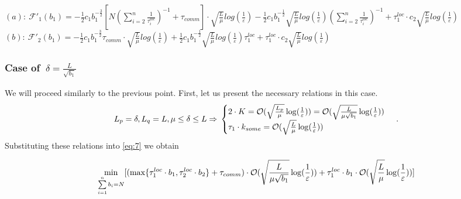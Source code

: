 \documentclass{article}
\begin{document}
$(a): ~\mathcal{F'}_1(b_1) = -\frac{1}{2}c_1 b_1^{-\frac{3}{2}}  [N (\sum\limits_{i = 2}^{n} \frac{1}{\tau_i^{loc}})^{-1} + \tau_{comm}]\cdot 
\sqrt{\frac{L}{\mu}}log (\frac{1}{\varepsilon})  - 
\frac{1}{2} c_1 b_1^{-\frac{1}{2}}   \sqrt{\frac{L}{\mu}}log (\frac{1}{\varepsilon})(\sum\limits_{i = 2}^{n} \frac{1}{\tau_i^{loc}})^{-1} +
\tau_1^{loc}\cdot c_2  \sqrt{\frac{L}{\mu}}log (\frac{1}{\varepsilon})$ \\
$(b): ~\mathcal{F'}_2(b_1) = -\frac{1}{2}c_1 b_1^{-\frac{3}{2}} \tau_{comm}\cdot \sqrt{\frac{L}{\mu}}log (\frac{1}{\varepsilon}) + \frac{1}{2} c_1 b_1^{-\frac{1}{2}}  \sqrt{\frac{L}{\mu}}log (\frac{1}{\varepsilon})\tau_1^{loc}   + \tau_1^{loc}\cdot c_2  \sqrt{\frac{L}{\mu}}log (\frac{1}{\varepsilon})$\\


\subsubsection{Case of $~\delta = \frac{L}{\sqrt{b_1}}$}
We will proceed similarly to the previous point. First, let us present the necessary relations in this case.
\begin{equation}
    \notag
    L_p = \delta, L_q = L, \mu \leq \delta \leq L \Rightarrow 
    \\
    \notag
    \begin{cases}
      2\cdot K = \mathcal O(\sqrt{\frac{L_p}{\mu}}\log(\frac{1}{\varepsilon}))  = \mathcal O(\sqrt{\frac{L}{\mu \sqrt{b_1}}}\log(\frac{1}{\varepsilon}))\\
      \tau_1\cdot k_{some} = \mathcal O(\sqrt{\frac{L}{\mu}}\log(\frac{1}{\varepsilon}))
    \end{cases}\,.
\end{equation}
Substituting these relations into \eqref{eq:7} we obtain

\begin{equation}
    \notag
    \underset{\sum\limits_{i = 1}^{n} b_i = N}{\min}[(\max\{\tau_1^{loc}\cdot b_1, \tau_2^{loc}\cdot b_2\} + \tau_{comm}) \cdot \mathcal O(\sqrt{\frac{L}{\mu \sqrt{b_1}}}\log(\frac{1}{\varepsilon})) + \tau_1^{loc}\cdot b_1 \cdot \mathcal O(\sqrt{\frac{L}{\mu}}\log(\frac{1}{\varepsilon}))]
\end{equation}
\end{document}
